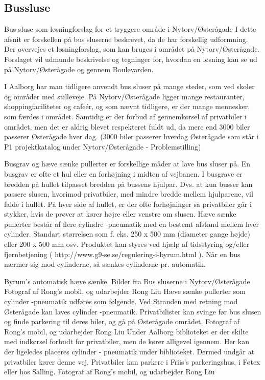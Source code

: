 \subsection{Bussluse}
\label{bussluse}

Bus sluse som løsningforslag for et tryggere område i Nytorv/Østerågade
I dette afsnit er forskellen på bus sluserne beskrevet, da de har forskellig udformning. Der overvejes et løsningforslag, som kan bruges i området på Nytorv/Østerågade. Forslaget vil udmunde beskrivelse og tegninger for, hvordan en løsning kan se ud på Nytorv/Østerågade og gennem Boulevarden.      

I Aalborg har man tidligere anvendt bus sluser på mange steder, som ved skoler og områder med stilleveje. På Nytorv/Østerågade ligger mange restauranter, shoppingfaciliteter og cafeér, og som nævnt tidligere, er der mange mennesker, som færdes i området. Samtidig er der forbud af gennemkørsel af privatbiler i området, men det er aldrig blevet respekteret fuldt ud, da mere end 3000 biler passerer Østerågade hver dag. (3000 biler passerer hverdag Østerågade som står i P1 projektkatalog under Nytorv/Østerågade - Problemstilling)

Busgrav og hæve sænke pullerter er forskellige måder at lave bus sluser på.
En busgrav er ofte et hul eller en forhøjning i midten af vejbanen. I busgrave er bredden på hullet tilpasset bredden på bussens hjulpar. Dvs. at kun busser kan passere slusen, hvorimod privatbiler, med mindre bredde mellem hjulparene, vil falde i hullet. På hver side af hullet, er der ofte forhøjninger så privatbiler går i stykker, hvis de prøver at kører højre eller venstre om slusen. 
Hæve sænke pullerter består af flere cylindre -pneumatik med en bestemt afstand mellem hver cylinder. Standart størrelsen som f. eks. 250 x 500 mm (diameter gange højde) eller 200 x 500 mm osv. Produktet kan styres ved hjælp af tidsstyring og/eller fjernbetjening ( http://www.g9-se.se/regulering-i-byrum.html ). Når en bus nærmer sig mod cylinderne, så sænkes cylinderne pr. automatik. 

             


          Byrum’s automatisk hæve sænke. Bilder fra %
Bus sluserne i Nytorv/Østerågade
                                            Fotograf af Rong’s mobil, og udarbejder Rong Liu
Hæve sænke pullerter som cylinder -pneumatik udføres som følgende. Ved Stranden med retning mod Østerågade kan laves cylinder -pneumatik. Privatbilister kan svinge før bus slusen og finde parkering til deres biler, og gå på Østerågade området. 
                                         Fotograf af Rong’s mobil, og udarbejder Rong Liu
Under Aalborg biblioteket er der skilte med indkørsel forbudt for privatbiler, men de kører alligevel igennem. Her kan der ligeledes placeres cylinder - pneumatik under biblioteket. Dermed undgår at privatbiler kører denne vej. Privatbiler kan parkere i Friis’s parkeringshus, i Føtex eller hos Salling.                         
                                                    Fotograf af Rong’s mobil, og udarbejder Rong Liu

